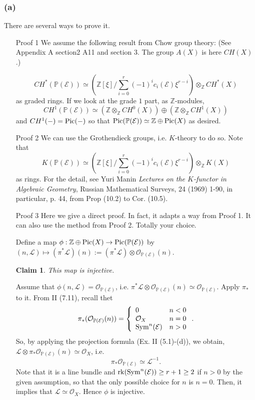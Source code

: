 \documentclass[11pt]{amsart}          %
\newcommand{\tuborg}{\left\{\begin{array}{ll}}
\newcommand{\sluttuborg}{\end{array}\right.}
\newcommand{\calO}{\mathcal{O}}
\newcommand{\calL}{\mathcal{L}}
\newcommand{\calE}{\mathcal{E}}
\newcommand{\bbZ}{\mathbb{Z}}
\newcommand{\bbP}{\mathbb{P}}
\newcommand{\pic}{{\rm Pic}}
\newcommand{\sym}{{\rm Sym}}
\newtheorem*{claim}{Claim}
\begin{document}
\subsubsection*{(a)} There are several ways to prove it. 
\begin{enumerate}
\item [Proof 1] We assume the following result from Chow group theory: (See Appendix A section2 A11 and section 3. The group $A(X)$ is here $CH(X)$.)

$$CH^*(\bbP(\calE)) \simeq \left( \bbZ[\xi]/ \sum_{i=0} ^r (-1)^i c_i (\calE) \xi ^{r-i} \right) \otimes_{\bbZ} CH^* (X)$$ as graded rings. If we look at the grade $1$ part, as $\bbZ$-modules, $$CH^1(\bbP(\calE)) \simeq (\bbZ \otimes_{\bbZ} CH^0(X) ) \oplus (\bbZ \otimes_{\bbZ} CH^1(X))$$ and $CH^1( - ) = \pic ( - )$ so that $\pic (\bbP(\calE)) \simeq \bbZ \oplus \pic (X)$ as desired.

\item [Proof 2] We can use the Grothendieck groups, i.e. $K$-theory to do so. Note that $$K(\bbP(\calE)) \simeq \left( \bbZ[\xi]/ \sum_{i=0} ^r (-1)^i c_i (\calE) \xi ^{r-i} \right) \otimes_{\bbZ} K(X)$$ as rings. For the detail, see Yuri Manin {\it Lectures on the $K$-functor in Algebraic Geometry}, Russian Mathematical Surveys, 24 (1969) 1-90, in particular, p. 44, from Prop (10.2) to Cor. (10.5).

\item [Proof 3] Here we give a direct proof. In fact, it adapts a way from Proof 1. It can also use the method from Proof 2. Totally your choice.

Define a map $\phi: \bbZ \oplus \pic (X) \to \pic (\bbP (\calE))$ by $(n, \calL) \mapsto (\pi^* \calL) (n) := (\pi^* \calL) \otimes \calO_{\bbP(\calE)} (n)$.

\begin{claim} This map is injective. \end{claim}

Assume that $\phi(n, \calL) = \calO_{\bbP(\calE)}$, i.e. $\pi^* \calL \otimes \calO_{\bbP(\calE)} (n) \simeq \calO_{\bbP(\calE)}$. Apply $\pi_*$ to it. From II (7.11), recall thet $$\pi_* (\calO_{\bbP(\calE)} (n)) = \tuborg 0 & n<0 \\ \calO_X & n=0 \\ \sym^n (\calE) & n >0 \sluttuborg.$$ So, by applying the projection formula (Ex. II (5.1)-(d)), we obtain, $\calL \otimes \pi_* \calO_{\bbP(\calE)}(n) \simeq \calO_X$, i.e. $$\pi_* \calO_{\bbP(\calE)} \simeq \calL^{-1}.$$ Note that it is a line bundle and ${\rm rk} (\sym ^n (\calE)) \geq r+1 \geq 2$ if $n>0$ by the given assumption, so that the only possible choice for $n$ is $n = 0$. Then, it implies that $\calL \simeq \calO_X$. Hence $\phi$ is injective.


\end{enumerate}
\end{document}
